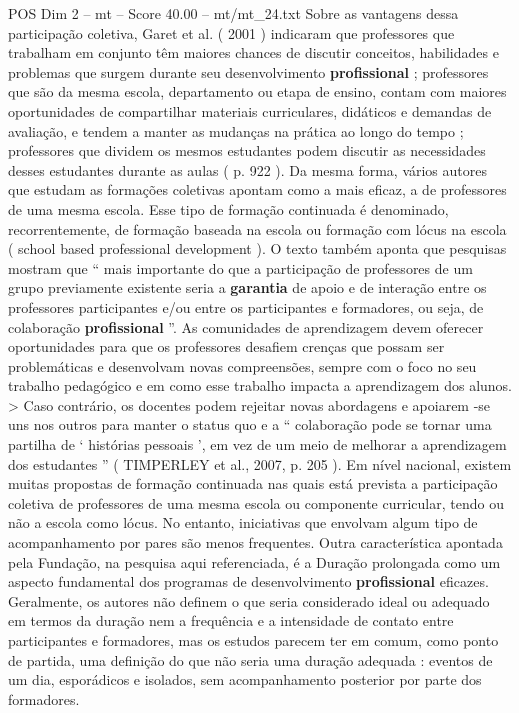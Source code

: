 \begin{textsample}{POS Dim 2 – mt – Score 40.00 – mt/mt\_24.txt}
Sobre as vantagens dessa participação coletiva, Garet et al. ( 2001 ) indicaram que professores que trabalham em conjunto têm maiores chances de discutir conceitos, habilidades e problemas que surgem durante seu desenvolvimento \textbf{profissional} ; professores que são da mesma escola, departamento ou etapa de ensino, contam com maiores oportunidades de compartilhar materiais curriculares, didáticos e demandas de avaliação, e tendem a manter as mudanças na prática ao longo do tempo ; professores que dividem os mesmos estudantes podem discutir as necessidades desses estudantes durante as aulas ( p. 922 ).
Da mesma forma, vários autores que estudam as formações coletivas apontam como a mais eficaz, a de professores de uma mesma escola.
Esse tipo de formação continuada é denominado, recorrentemente, de formação baseada na escola ou formação com lócus na escola ( school based professional development ).
O texto também aponta que pesquisas mostram que “ mais importante do que a participação de professores de um grupo previamente existente seria a \textbf{garantia} de apoio e de interação entre os professores participantes e/ou entre os participantes e formadores, ou seja, de colaboração \textbf{profissional} ”.
As comunidades de aprendizagem devem oferecer oportunidades para que os professores desafiem crenças que possam ser problemáticas e desenvolvam novas compreensões, sempre com o foco no seu trabalho pedagógico e em como esse trabalho impacta a aprendizagem dos alunos. > Caso contrário, os docentes podem rejeitar novas abordagens e apoiarem -se uns nos outros para manter o status quo e a “ colaboração pode se tornar uma partilha de ‘ histórias pessoais ’, em vez de um meio de melhorar a aprendizagem dos estudantes ” ( TIMPERLEY et al., 2007, p. 205 ).
Em nível nacional, existem muitas propostas de formação continuada nas quais está prevista a participação coletiva de professores de uma mesma escola ou componente curricular, tendo ou não a escola como lócus.
No entanto, iniciativas que envolvam algum tipo de acompanhamento por pares são menos frequentes.
Outra característica apontada pela Fundação, na pesquisa aqui referenciada, é a Duração prolongada como um aspecto fundamental dos programas de desenvolvimento \textbf{profissional} eficazes.
Geralmente, os autores não definem o que seria considerado ideal ou adequado em termos da duração nem a frequência e a intensidade de contato entre participantes e formadores, mas os estudos parecem ter em comum, como ponto de partida, uma definição do que não seria uma duração adequada : eventos de um dia, esporádicos e isolados, sem acompanhamento posterior por parte dos formadores.

\end{textsample}
